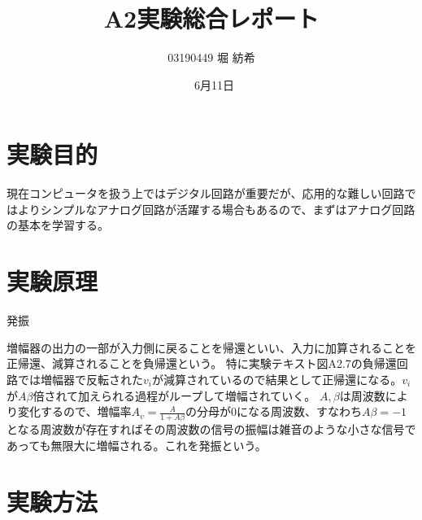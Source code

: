 \documentclass[dvipdfmx, twocolumn]{jsarticle}
\begin{document}
\title{A2実験総合レポート}
\author{03190449  堀 紡希}
\date{\ 6月11日}
\maketitle
\section{実験目的}

現在コンピュータを扱う上ではデジタル回路が重要だが、応用的な難しい回路ではよりシンプルなアナログ回路が活躍する場合もあるので、まずはアナログ回路の基本を学習する。
\section{実験原理}
発振

増幅器の出力の一部が入力側に戻ることを帰還といい、入力に加算されることを正帰還、減算されることを負帰還という。
特に実験テキスト図A2.7の負帰還回路では増幅器で反転された$v_{i}$が減算されているので結果として正帰還になる。$v_{i}$が$A\beta$倍されて加えられる過程がループして増幅されていく。
$A, \beta$は周波数により変化するので、増幅率$A_{v} = \frac{A}{1+A\beta}$の分母が0になる周波数、すなわち$A\beta = -1$となる周波数が存在すればその周波数の信号の振幅は雑音のような小さな信号であっても無限大に増幅される。これを発振という。

\section{実験方法}
\end{document}
